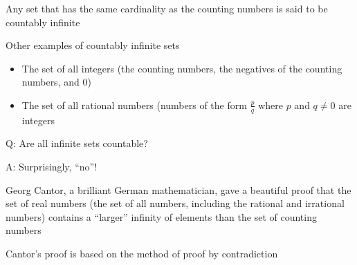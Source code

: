 \documentclass[8pt,a4paper,compress]{beamer}
\begin{document}
\begin{frame}[fragile]
\pause

Any set that has the same cardinality as the counting numbers is said to be countably infinite

\pause
\bigskip

Other examples of countably infinite sets
\begin{itemize}
\item The set of all integers (the counting numbers, the negatives of the counting numbers, and 0)

\item The set of all rational numbers (numbers of the form $\frac{p}{q}$ where $p$ and $q \neq 0$ are integers
\end{itemize}

\pause
\bigskip

Q: Are all infinite sets countable?

\pause
\bigskip

A: Surprisingly, ``no''! 

\pause
\bigskip

Georg Cantor, a brilliant German mathematician, gave a beautiful proof that the set of real numbers (the set of all numbers, including the rational and irrational numbers) contains a ``larger'' infinity of elements than the set of counting numbers

\pause
\bigskip

Cantor's proof is based on the method of proof by contradiction
\end{frame}
\end{document}
